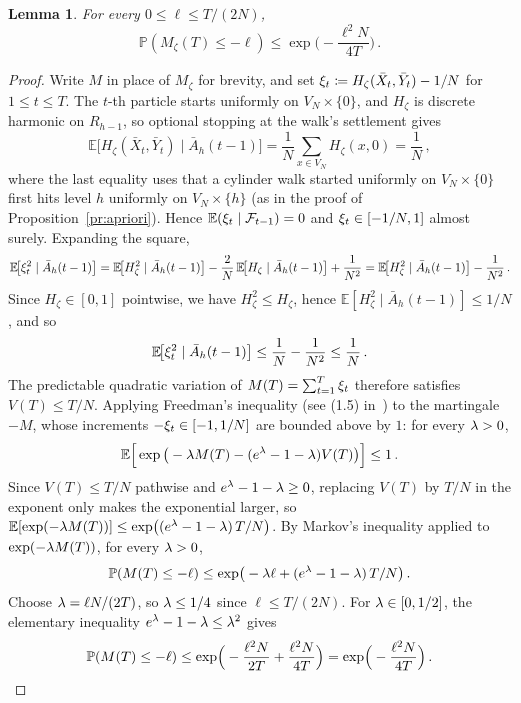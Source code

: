\documentclass[11pt,a4paper,reqno]{amsart}
\newtheorem{Lemma}[Theorem]{Lemma}
\theoremstyle{definition}
\newcommand{\cF}{\ensuremath{\mathcal F}}
\newcommand{\bbE}{{\ensuremath{\mathbb E}} }
\newcommand{\bbP}{{\ensuremath{\mathbb P}} }
\begin{document}
\begin{Lemma} \label{lem:M lower tail}
For every $0 \leq \ell \leq T/(2N)$,
$$ \bbP( M_\zeta(T) \leq -\ell ) \leq \exp\!\Big( -\frac{\ell^2 N}{4T} \Big)\,. $$
\end{Lemma}

\begin{proof}
Write $M$ in place of $M_\zeta$ for brevity, and set $\xi_t \coloneqq H_\zeta(\bar X_{t}, \bar Y_{t}) - 1/N$ for $1 \leq t \leq T$. The $t$-th particle starts uniformly on $V_N \times \{0\}$, and $H_\zeta$ is discrete harmonic on $R_{h-1}$, so optional stopping at the walk's settlement gives
	\[ \bbE\!\big[ H_\zeta(\bar X_t, \bar Y_t) \mid \bar A_h(t-1) \big] = \frac{1}{N} \sum_{x \in V_N} H_\zeta(x, 0) = \frac{1}{N}\,, \]
where the last equality uses that a cylinder walk started uniformly on $V_N \times \{0\}$ first hits level $h$ uniformly on $V_N \times \{h\}$ (as in the proof of Proposition~\ref{pr:apriori}).
Hence $\bbE(\x_t \mid \cF_{t-1}) = 0$ and $\xi_t \in [-1/N, 1]$ almost surely. Expanding the square,
	\[ \bbE\!\big[ \x_t^2 \mid \bar A_h(t-1) \big] = \bbE\!\big[ H_\zeta^2 \mid \bar A_h(t-1) \big] - \frac{2}{N}\,\bbE\!\big[ H_\zeta \mid \bar A_h(t-1) \big] + \frac{1}{N^2}
	= \bbE\!\big[ H_\zeta^2 \mid \bar A_h(t-1) \big] - \frac{1}{N^2}\,. \]
Since $H_\zeta \in [0, 1]$ pointwise, we have $H_\zeta^2 \leq H_\zeta$, hence $\bbE[H_\zeta^2 \mid \bar A_h(t-1)] \leq 1/N$, and so
	\[ \bbE\!\big[ \x_t^2 \mid \bar A_h(t-1) \big] \leq \frac{1}{N} - \frac{1}{N^2} \leq \frac{1}{N}\,. \]
The predictable quadratic variation of $M(T) = \sum_{t=1}^T \xi_t$ therefore satisfies $V(T) \leq T/N$.
Applying Freedman's inequality (see (1.5) in~\cite{freedman1975tail}) to the martingale $-M$, whose increments $-\xi_t \in [-1, 1/N]$ are bounded above by $1$: for every $\lambda > 0$,
	\[ \bbE \Big[ \exp \big( -\l M(T) - (e^\l-1-\l) V(T) \big) \Big] \leq 1\,. \]
Since $V(T) \leq T/N$ pathwise and $e^\lambda - 1 - \lambda \geq 0$, replacing $V(T)$ by $T/N$ in the exponent only makes the exponential larger, so $\bbE[\exp(-\l M(T))] \leq \exp\!\big((e^\l - 1 - \l)\,T/N\big)$. By Markov's inequality applied to $\exp(-\lambda M(T))$, for every $\lambda > 0$,
	\[ \bbP(M(T) \leq -\ell) \leq \exp\!\big(-\l \ell + (e^\l - 1 - \l)\,T/N\big)\,. \]
Choose $\lambda = \ell N/(2T)$, so $\lambda \leq 1/4$ since $\ell \leq T/(2N)$. For $\lambda \in [0, 1/2]$, the elementary inequality $e^\lambda - 1 - \lambda \leq \lambda^2$ gives
	\[ \bbP(M(T) \leq -\ell) \leq \exp\!\Big(-\frac{\ell^2 N}{2T} + \frac{\ell^2 N}{4T}\Big) = \exp\!\Big(-\frac{\ell^2 N}{4T}\Big)\,. \qedhere \]
\end{proof}
\end{document}
